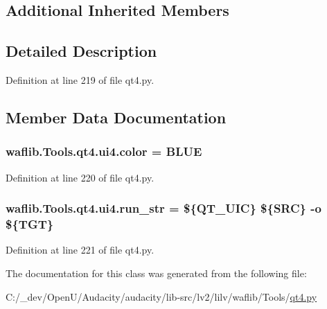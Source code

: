 \subsection*{Additional Inherited Members}


\subsection{Detailed Description}


Definition at line 219 of file qt4.\+py.



\subsection{Member Data Documentation}
\subsubsection[{\texorpdfstring{color}{color}}]{ waflib.\+Tools.\+qt4.\+ui4.\+color = \textquotesingle{}B\+L\+UE\textquotesingle{}\hspace{0.3cm}{\ttfamily [static]}}\hypertarget{classwaflib_1_1_tools_1_1qt4_1_1ui4_ad56de643efd5ceb7cba371ed6fe9c861}{}\label{classwaflib_1_1_tools_1_1qt4_1_1ui4_ad56de643efd5ceb7cba371ed6fe9c861}


Definition at line 220 of file qt4.\+py.

\subsubsection[{\texorpdfstring{run\+\_\+str}{run_str}}]{ waflib.\+Tools.\+qt4.\+ui4.\+run\+\_\+str = \textquotesingle{}\$\{Q\+T\+\_\+\+U\+IC\} \$\{S\+RC\} -\/o \$\{T\+GT\}\textquotesingle{}\hspace{0.3cm}{\ttfamily [static]}}\hypertarget{classwaflib_1_1_tools_1_1qt4_1_1ui4_afe0025efb64a818695607ed467b74970}{}\label{classwaflib_1_1_tools_1_1qt4_1_1ui4_afe0025efb64a818695607ed467b74970}


Definition at line 221 of file qt4.\+py.



The documentation for this class was generated from the following file\+:\begin{DoxyCompactItemize}
\item 
C\+:/\+\_\+dev/\+Open\+U/\+Audacity/audacity/lib-\/src/lv2/lilv/waflib/\+Tools/\hyperlink{lilv_2waflib_2_tools_2qt4_8py}{qt4.\+py}\end{DoxyCompactItemize}
